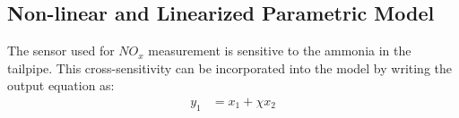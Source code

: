 
\subsection{Non-linear and Linearized Parametric Model}

The sensor used for $NO_x$ measurement is sensitive to the ammonia in the
tailpipe. This cross-sensitivity can be incorporated into the model by writing
the output equation as:
\begin{align*}
    y_1 &= x_1 + \chi x_2\\
\end{align*}

